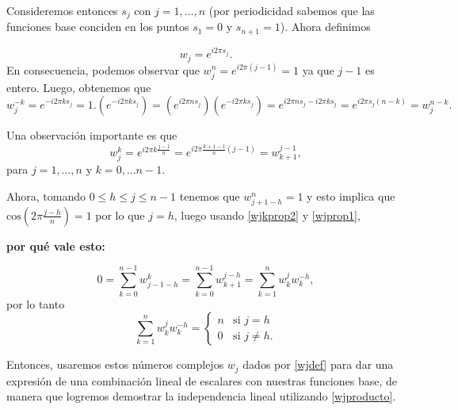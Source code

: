 \documentclass[a4paper,10pt]{book}
\begin{document}
Consideremos entonces $s_j$ con $j=1,\ldots,n$ (por periodicidad sabemos que las funciones base conciden en los puntos $s_1=0$ y $s_{n+1}=1$). Ahora definimos

\begin{equation}\label{wjdef}
    w_j=e^{i2\pi s_j}.
\end{equation}
En consecuencia, podemos observar que $w_j^n=e^{i2\pi(j-1)}=1$ ya que $j-1$ es entero. Luego, obtenemos que 
\begin{equation}\label{wjprop1}
    w_j^{-k}=e^{-i2\pi ks_j}=1.(e^{-i2\pi ks_j})=(e^{i2\pi ns_j})(e^{-i2\pi ks_j})=e^{i2\pi ns_j-i2\pi ks_j}=e^{i2\pi s_j(n-k)}=w_j^{n-k}.
\end{equation}


Una observación importante es que 
\begin{equation}\label{wjkprop2}
    w_j^k=e^{i2\pi k\frac{j-1}{n}}=e^{i2\pi\frac{k+1-1}{n}(j-1)}=w_{k+1}^{j-1},
\end{equation}
para $j=1,\ldots,n$ y $k=0,\ldots n-1$.

Ahora, tomando $0\leq h\leq j\leq n-1$ tenemos que $w_{j+1-h}^n=1$ y esto implica que $\mathrm{cos}(2\pi\frac{j-h}{n})=1$ por lo que $j=h$, luego usando \eqref{wjkprop2} y \eqref{wjprop1}, 

\textbf{por qué vale esto:}

\begin{equation}\label{wjproducto}
    0=\displaystyle\sum_{k=0}^{n-1}w_{j-1-h}^k=\displaystyle\sum_{k=0}^{n-1}w_{k+1}^{j-h}=\displaystyle\sum_{k=1}^{n}w_k^jw_k^{-h},
\end{equation}
por lo tanto
\begin{equation}\label{wkproducto}
    \displaystyle\sum_{k=1}^{n}w_k^jw_k^{-h}=\left\{\begin{array}{ll}
         n&\mbox{si }j=h\\
         0&\mbox{si }j\neq h.
    \end{array}\right.
\end{equation}

Entonces, usaremos estos números complejos $w_j$ dados por \eqref{wjdef} para dar una expresión de una combinación lineal de escalares con nuestras funciones base, de manera que logremos demostrar la independencia lineal utilizando \eqref{wjproducto}.
\end{document}
